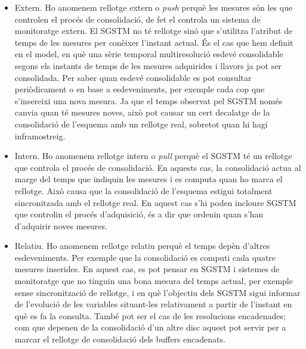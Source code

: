\begin{itemize}
\item Extern. Ho anomenem rellotge extern o \emph{push} perquè les
  mesures són les que controlen el procés de consolidació, de fet el
  controla un sistema de monitoratge extern.  El \gls{SGSTM} no té
  rellotge sinó que s'utilitza l'atribut de temps de les mesures per
  conèixer l'instant actual.  És el cas que hem definit en el model,
  en què una sèrie temporal multiresolució esdevé consolidable segons
  els instants de temps de les mesures adquirides i llavors ja pot ser
  consolidada. Per saber quan esdevé consolidable es pot consultar
  periòdicament o en base a esdeveniments, per exemple cada cop que
  s'insereixi una nova mesura.  Ja que el temps observat pel
  \gls{SGSTM} només canvia quan té mesures noves, això pot causar un
  cert decalatge de la consolidació de l'esquema amb un rellotge real,
  sobretot quan hi hagi inframostreig. 

\item Intern. Ho anomenem rellotge intern o \emph{pull} perquè el
  \gls{SGSTM} té un rellotge que controla el procés de consolidació.
  En aquests cas, la consolidació actua al marge del temps que
  indiquin les mesures i es computa quan ho marca el rellotge.  Això
  causa que la consolidació de l'esquema estigui totalment
  sincronitzada amb el rellotge real. En aquest cas s'hi poden
  incloure \gls{SGSTM} que controlin el procés d'adquisició, és a dir
  que ordenin quan s'han d'adquirir noves mesures. 


\item Relatiu.  Ho anomenem rellotge relatiu perquè el temps depèn
  d'altres esdeveniments. Per exemple que la consolidació es computi
  cada quatre mesures inserides. En aquest cas, es pot pensar en
  \gls{SGSTM} i sistemes de monitoratge que no tinguin una bona mesura
  del temps actual, per exemple sense sincronització de rellotge, i en
  què l'objectiu dels \gls{SGSTM} sigui informar de l'evolució de les
  variables situant-les relativament a partir de l'instant en què es
  fa la consulta. També pot ser el cas de les resolucions encadenades;
  com que depenen de la consolidació d'un altre disc aquest pot servir
  per a marcar el rellotge de consolidació dels buffers encadenats.




\end{itemize}











